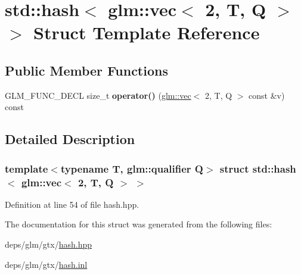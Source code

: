 \hypertarget{structstd_1_1hash_3_01glm_1_1vec_3_012_00_01T_00_01Q_01_4_01_4}{}\section{std\+:\+:hash$<$ glm\+:\+:vec$<$ 2, T, Q $>$ $>$ Struct Template Reference}
\label{structstd_1_1hash_3_01glm_1_1vec_3_012_00_01T_00_01Q_01_4_01_4}
\subsection*{Public Member Functions}
\begin{DoxyCompactItemize}
\item 
\mbox{\label{structstd_1_1hash_3_01glm_1_1vec_3_012_00_01T_00_01Q_01_4_01_4_aa815a44b0301457ded0133ff25134350}} 
G\+L\+M\+\_\+\+F\+U\+N\+C\+\_\+\+D\+E\+CL size\+\_\+t {\bfseries operator()} (\hyperlink{structglm_1_1vec}{glm\+::vec}$<$ 2, T, Q $>$ const \&v) const
\end{DoxyCompactItemize}


\subsection{Detailed Description}
\subsubsection*{template$<$typename T, glm\+::qualifier Q$>$\newline
struct std\+::hash$<$ glm\+::vec$<$ 2, T, Q $>$ $>$}



Definition at line 54 of file hash.\+hpp.



The documentation for this struct was generated from the following files\+:\begin{DoxyCompactItemize}
\item 
deps/glm/gtx/\hyperlink{hash_8hpp}{hash.\+hpp}\item 
deps/glm/gtx/\hyperlink{hash_8inl}{hash.\+inl}\end{DoxyCompactItemize}
